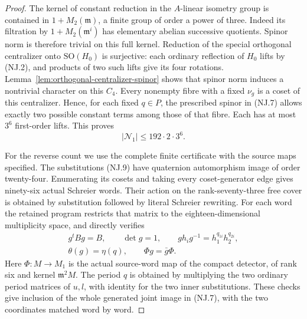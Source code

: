 \begin{proof}
The kernel of constant reduction in the \(A\)-linear isometry group
is contained in \(1+M_2(\mathfrak m)\), a finite group of order a
power of three. Indeed its filtration by
\(1+M_2(\mathfrak m^i)\) has elementary abelian successive
quotients. Spinor norm is therefore trivial on this full kernel.
Reduction of the special orthogonal centralizer onto \(\mathrm{SO}(H_0)\)
is surjective: each ordinary reflection of \(H_0\) lifts by (NJ.2),
and products of two such lifts give its four rotations.
Lemma~\ref{lem:orthogonal-centralizer-spinor} shows that spinor norm
induces a nontrivial character on this \(C_4\).
Every nonempty fibre with a fixed \(\nu_g\) is a coset of this
centralizer. Hence, for each fixed \(q\in P\), the prescribed
spinor in (NJ.7) allows exactly two possible constant terms among
those of that fibre. Each has at most \(3^6\) first-order lifts.
This proves
\[
                       |\mathcal N_1|\le192\cdot2\cdot3^6.
 \tag{NJ.14}
\]

For the reverse count we use the complete finite certificate with
the source maps specified. The substitutions (NJ.9) have quaternion
automorphism image of order twenty-four. Enumerating its cosets
and taking every coset-generator edge gives ninety-six actual
Schreier words. Their action on the rank-seventy-three free cover
is obtained by substitution followed by literal Schreier rewriting.
For each word the retained program restricts that matrix to the
eighteen-dimensional multiplicity space, and directly verifies
\[
 \begin{gathered}
        g^tBg=B,\qquad\det g=1,\qquad
        gh_i g^{-1}=h_1^{q_{1i}}h_2^{q_{2i}},\\
        \theta(g)=\eta(q),\qquad
        \Phi g=\bar g\Phi.
 \end{gathered}
 \tag{NJ.15}
\]
Here \(\Phi:M\to M_1\) is the actual source-word map of the
compact detector, of rank six and kernel \(\mathfrak m^2M\).
The period \(q\) is obtained by multiplying the two ordinary
period matrices of \(u,l\), with identity for the two inner
substitutions. These checks give inclusion of the whole generated
joint image in (NJ.7), with the two coordinates matched word by word.


\end{proof}

